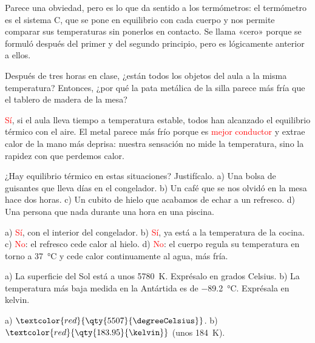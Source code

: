 Parece una obviedad, pero es lo que da sentido a los termómetros: el termómetro es el sistema C, que se pone en equilibrio con
cada cuerpo y nos permite comparar sus temperaturas sin ponerlos en contacto. Se llama «cero» porque se formuló después del
primer y del segundo principio, pero es lógicamente anterior a ellos.

\begin{exercise}
    Después de tres horas en clase, ¿están todos los objetos del aula a la misma temperatura? Entonces, ¿por qué la pata metálica
    de la silla parece más fría que el tablero de madera de la mesa?
    \begin{solu}
        \textcolor{red}{Sí}, si el aula lleva tiempo a temperatura estable, todos han alcanzado el equilibrio térmico con el aire.
        El metal parece más frío porque es \textcolor{red}{mejor conductor} y extrae calor de la mano más deprisa: nuestra
        sensación no mide la temperatura, sino la rapidez con que perdemos calor.
    \end{solu}
\end{exercise}

\begin{exercise}
    ¿Hay equilibrio térmico en estas situaciones? Justifícalo. a) Una bolsa de guisantes que lleva días en el congelador. b) Un
    café que se nos olvidó en la mesa hace dos horas. c) Un cubito de hielo que acabamos de echar a un refresco. d) Una persona
    que nada durante una hora en una piscina.
    \begin{solu}
        a) \textcolor{red}{Sí}, con el interior del congelador. b) \textcolor{red}{Sí}, ya está a la temperatura de la cocina. c)
        \textcolor{red}{No}: el refresco cede calor al hielo. d) \textcolor{red}{No}: el cuerpo regula su temperatura en torno a
        \qty{37}{\degreeCelsius} y cede calor continuamente al agua, más fría.
    \end{solu}
\end{exercise}

\begin{exercise}
    a) La superficie del Sol está a unos \qty{5780}{\kelvin}. Exprésalo en grados Celsius. b) La temperatura más baja medida en la
    Antártida es de \qty{-89.2}{\degreeCelsius}. Exprésala en kelvin.
    \begin{solu}
        a) \(\textcolor{red}{\qty{5507}{\degreeCelsius}}\). b) \(\textcolor{red}{\qty{183.95}{\kelvin}}\) (unos \qty{184}{\kelvin}).
    \end{solu}
\end{exercise}

